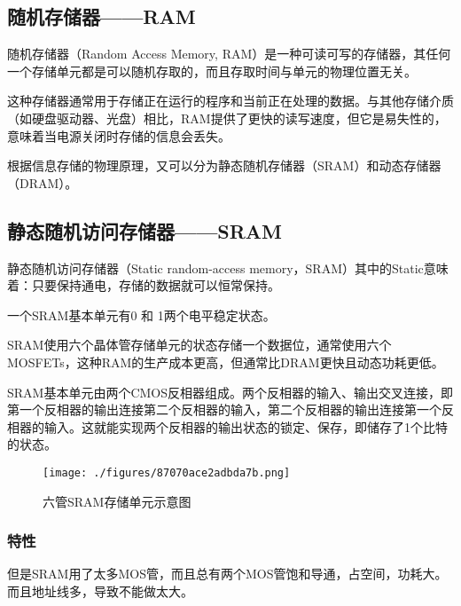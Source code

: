 
\begin{issues}
\issueDraft
\end{issues}

\subsection{随机存储器——RAM}

随机存储器（Random Access Memory, RAM）是一种可读可写的存储器，其任何一个存储单元都是可以随机存取的，而且存取时间与单元的物理位置无关。

这种存储器通常用于存储正在运行的程序和当前正在处理的数据。与其他存储介质（如硬盘驱动器、光盘）相比，RAM提供了更快的读写速度，但它是易失性的，意味着当电源关闭时存储的信息会丢失。

根据信息存储的物理原理，又可以分为静态随机存储器（SRAM）和动态存储器（DRAM）。


\subsection{静态随机访问存储器——SRAM}

静态随机访问存储器（Static random-access memory，SRAM）其中的Static意味着：只要保持通电，存储的数据就可以恒常保持。

一个SRAM基本单元有0 和 1两个电平稳定状态。

SRAM使用六个晶体管存储单元的状态存储一个数据位，通常使用六个MOSFETs，这种RAM的生产成本更高，但通常比DRAM更快且动态功耗更低。

SRAM基本单元由两个CMOS反相器组成。两个反相器的输入、输出交叉连接，即第一个反相器的输出连接第二个反相器的输入，第二个反相器的输出连接第一个反相器的输入。这就能实现两个反相器的输出状态的锁定、保存，即储存了1个比特的状态。

\begin{figure}[ht]
\centering
\texttt{[image: ./figures/87070ace2adbda7b.png]}
\caption{六管SRAM存储单元示意图} \label{fig_RAM_3}
\end{figure}




\subsubsection{特性}

但是SRAM用了太多MOS管，而且总有两个MOS管饱和导通，占空间，功耗大。而且地址线多，导致不能做太大。

